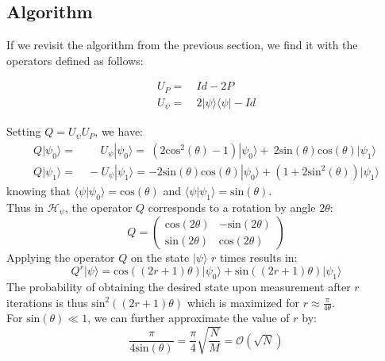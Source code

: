 \subsection{Algorithm}

If we revisit the algorithm from the previous section, we find it with the operators defined as follows:

\begin{align*}
	U_{P} = & \ Id - 2P \\
    U_{\psi} = & \ 2 | \psi \rangle \langle \psi | - Id
\end{align*}

\noindent Setting $Q = U_{\psi} U_{P} $, we have:
\begin{align*}
	Q | \psi_0 \rangle =& \quad \ \, U_{\psi} | \psi_0 \rangle = \ (2 \mathrm{cos}^2(\theta)-1) | \psi_0 \rangle + \ 2 \mathrm{sin}(\theta)\mathrm{cos}(\theta) | \psi_1 \rangle \\
    Q | \psi_1 \rangle =&\ -U_{\psi} | \psi_1 \rangle = -2 \mathrm{sin}(\theta)\mathrm{cos}(\theta) | \psi_0 \rangle + (1 + 2 \mathrm{sin}^2(\theta)) | \psi_1 \rangle
\end{align*}
knowing that $\langle \psi | \psi_0 \rangle = \mathrm{cos}(\theta)$ and $\langle \psi | \psi_1 \rangle = \mathrm{sin}(\theta)$.
\\[5pt]
Thus in $\mathcal{H}_{\psi}$, the operator $Q$ corresponds to a rotation by angle $2\theta$:
\[
Q =
\begin{pmatrix}
\mathrm{cos}(2\theta) & -\mathrm{sin}(2\theta) \\
\mathrm{sin}(2\theta) & \mathrm{cos}(2\theta)
\end{pmatrix}
\]
Applying the operator $Q$ on the state $| \psi \rangle$ $r$ times results in:
\[ Q^r | \psi \rangle = \mathrm{cos}((2r+1)\theta)| \psi_0 \rangle + \mathrm{sin}((2r+1)\theta)| \psi_1 \rangle\]
The probability of obtaining the desired state upon measurement after $r$ iterations is thus $\mathrm{sin}^2 \left( \left( 2r + 1 \right) \theta \right)$ which is maximized for $r \approx \frac{\pi}{4\theta}$. 
\\[5pt]
For $\mathrm{sin}(\theta) \ll 1$, we can further approximate the value of $r$ by: \[\frac{\pi}{4\mathrm{sin}(\theta)} = \frac{\pi}{4} \sqrt{\frac{N}{M}} = \mathcal{O}(\sqrt{N})\]
